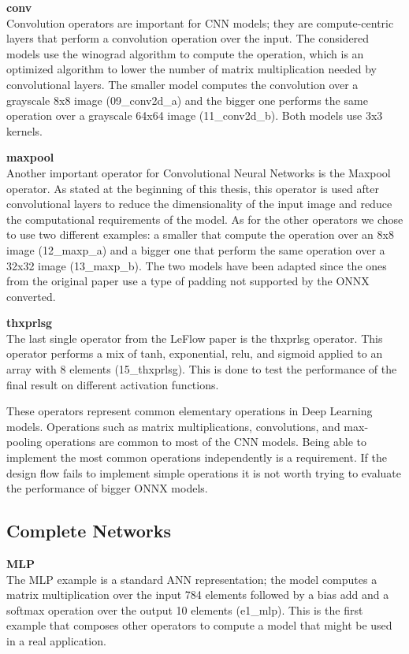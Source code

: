 \documentclass[../main.tex]{subfiles}
\begin{document}
\textbf{conv}\\
Convolution operators are important for CNN models; they are compute-centric layers that perform a convolution operation over the input.
The considered models use the winograd algorithm to compute the operation, which is an optimized algorithm to lower the number of matrix multiplication needed by convolutional layers.
The smaller model computes the convolution over a grayscale 8x8 image (09\_conv2d\_a) and the bigger one performs the same operation over a grayscale 64x64 image (11\_conv2d\_b).
Both models use 3x3 kernels.

\textbf{maxpool}\\
Another important operator for Convolutional Neural Networks is the Maxpool operator.
As stated at the beginning of this thesis, this operator is used after convolutional layers to reduce the dimensionality of the input image and reduce the computational requirements of the model.
As for the other operators we chose to use two different examples: a smaller that compute the operation over an 8x8 image (12\_maxp\_a) and a bigger one that perform the same operation over a 32x32 image (13\_maxp\_b).
The two models have been adapted since the ones from the original paper use a type of padding not supported by the ONNX converted.

\textbf{thxprlsg}\\
The last single operator from the LeFlow paper is the thxprlsg operator.
This operator performs a mix of tanh, exponential, relu, and sigmoid applied to an array with 8 elements (15\_thxprlsg).
This is done to test the performance of the final result on different activation functions.

\bigskip

These operators represent common elementary operations in Deep Learning models.
Operations such as matrix multiplications, convolutions, and max-pooling operations are common to most of the CNN models.
Being able to implement the most common operations independently is a requirement.
If the design flow fails to implement simple operations it is not worth trying to evaluate the performance of bigger ONNX models.

\subsection{Complete Networks}

\textbf{MLP}\\
The MLP example is a standard ANN representation; the model computes a matrix multiplication over the input 784 elements followed by a bias add and a softmax operation over the output 10 elements (e1\_mlp).
This is the first example that composes other operators to compute a model that might be used in a real application.
\end{document}
